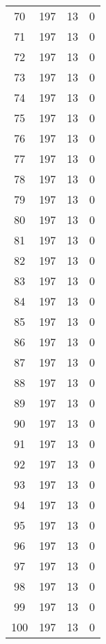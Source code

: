 \begin{longtable}[!]{c|ccc}
	70	& 197	& 13	& 0	\\
	71	& 197	& 13	& 0	\\
	72	& 197	& 13	& 0	\\
	73	& 197	& 13	& 0	\\
	74	& 197	& 13	& 0	\\
	75	& 197	& 13	& 0	\\
	76	& 197	& 13	& 0	\\
	77	& 197	& 13	& 0	\\
	78	& 197	& 13	& 0	\\
	79	& 197	& 13	& 0	\\
	80	& 197	& 13	& 0	\\
	81	& 197	& 13	& 0	\\
	82	& 197	& 13	& 0	\\
	83	& 197	& 13	& 0	\\
	84	& 197	& 13	& 0	\\
	85	& 197	& 13	& 0	\\
	86	& 197	& 13	& 0	\\
	87	& 197	& 13	& 0	\\
	88	& 197	& 13	& 0	\\
	89	& 197	& 13	& 0	\\
	90	& 197	& 13	& 0	\\
	91	& 197	& 13	& 0	\\
	92	& 197	& 13	& 0	\\
	93	& 197	& 13	& 0	\\
	94	& 197	& 13	& 0	\\
	95	& 197	& 13	& 0	\\
	96	& 197	& 13	& 0	\\
	97	& 197	& 13	& 0	\\
	98	& 197	& 13	& 0	\\
	99	& 197	& 13	& 0	\\
	100	& 197	& 13	& 0	\\
\end{longtable}